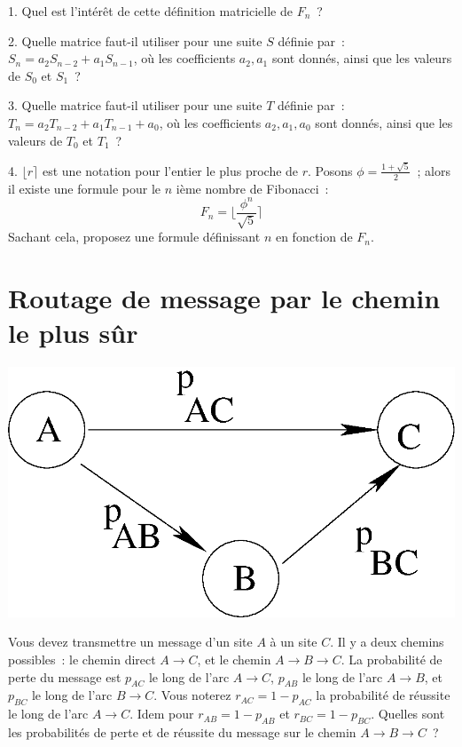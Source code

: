 \documentclass[11pt]{article}
\begin{document}
1. Quel est l'intérêt de cette définition matricielle de $F_n$~? 

2. Quelle matrice faut-il utiliser pour une suite $S$ définie par~:
$S_n = a_2 S_{n-2} + a_1 S_{n-1}$,  où les coefficients $a_2, a_1$
sont donnés, ainsi que les valeurs de $S_0$ et $S_1$~?

3. Quelle matrice faut-il utiliser pour une suite $T$ définie par~:
$T_n = a_2 T_{n-2} + a_1 T_{n-1} + a_0$, où les coefficients $a_2, a_1, a_0$ sont donnés, ainsi que les valeurs de $T_0$ et $T_1$~?

4. $\bigl\lfloor r \bigr\rceil$ est une notation pour l'entier le plus proche de $r$.  
Posons $\phi=\frac{1+\sqrt{5}}{2}$~; alors il existe une formule
pour le $n$ ième nombre de Fibonacci~:
$$F_n =\biggl\lfloor \frac{\phi^n}{\sqrt{5}} \biggr\rceil$$
Sachant cela, proposez une formule définissant $n$ en fonction de $F_n$.


\section{Routage de message par le chemin le plus sûr}

\begin{center}
\includegraphics[width=0.4\linewidth]{routage.eps}
\end{center}

Vous devez transmettre un message d'un site  $A$ à  un site $C$.
Il y a deux chemins possibles~: le chemin direct $A \rightarrow C$,
et le chemin $A \rightarrow B \rightarrow C$. La probabilité de 
perte du message est $p_{AC}$ le long de l'arc $A \rightarrow C$,
$p_{AB}$ le long de l'arc $A \rightarrow B$, 
et $p_{BC}$ le long de l'arc $B \rightarrow C$. 
Vous noterez $r_{AC}=1-p_{AC}$
la  probabilité de réussite le long de l'arc $A \rightarrow C$. Idem pour
$r_{AB}=1-p_{AB}$ et $r_{BC}=1-p_{BC}$.
Quelles  sont les probabilités de perte et  de réussite du message sur le chemin $A \rightarrow B \rightarrow C$~?


\end{document}
